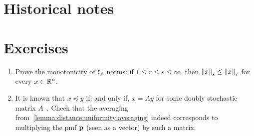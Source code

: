 \section{Historical notes}
\cite{Ingster??}
\cite{GoldreichR00}
\cite{Batu++}
\cite{Paninski08}
\cite{ChanDVV14}
\cite{AcharyaDK15}
\cite{DiakonikolasGPP18}
\cite{BlaisCG17}
\cite{HuangM13}

\section{Exercises}
\begin{enumerate}
  \item Prove the monotonicity of $\lp[p]$ norms: if $1\leq r\leq s \leq \infty$, then $\norm{x}_s \leq \norm{x}_r$ for every $x\in \R^n$.
  \item It is known that $x\preceq y$ if, and only if, $x=Ay$ for some doubly stochastic matrix $A$~\citep[Theorem~2.1]{Arnold87}. Check that the averaging from~\cref{lemma:distance:uniformity:averaging} indeed corresponds to multiplying the pmf $\p$ (seen as a vector) by such a matrix.
\end{enumerate}

